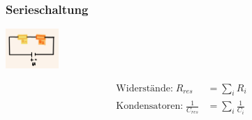 \subsubsection*{Serieschaltung}
\vspace{-1mm}
\begin{minipage}{0.39\linewidth}
    \begin{footnotesize}
        \begin{center}
            \vspace{2mm}
            \includegraphics[width = 20mm]{src/images/serieschaltung.png}
        \end{center}
    \end{footnotesize}
\end{minipage}
\begin{minipage}{0.6\linewidth}
    \begin{scriptsize}
        \begin{center}
            \begin{align*}
                \text{Widerstände:} \; R_{res} &= \sum\limits_i R_i\\
                \text{Kondensatoren:} \; \frac{1}{C_{res}} &= \sum\limits_i \frac{1}{C_i}
            \end{align*}
        \end{center}
    \end{scriptsize}
\end{minipage}
\vspace{1mm}

